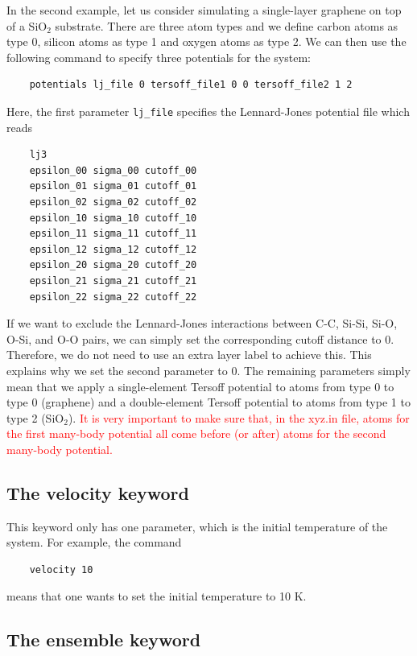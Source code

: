 \documentclass[12pt,a4paper]{report}
\begin{document}
In the second example, let us consider simulating a single-layer graphene on top of a SiO$_2$ substrate. There are three atom types and we define carbon atoms as type 0, silicon atoms as type 1 and oxygen atoms as type 2. We can then use the following command to specify three potentials for the system:
\begin{verbatim}
    potentials lj_file 0 tersoff_file1 0 0 tersoff_file2 1 2
\end{verbatim}
Here,  the first parameter \verb"lj_file" specifies the Lennard-Jones potential file which reads 
\begin{verbatim}
    lj3
    epsilon_00 sigma_00 cutoff_00
    epsilon_01 sigma_01 cutoff_01
    epsilon_02 sigma_02 cutoff_02
    epsilon_10 sigma_10 cutoff_10
    epsilon_11 sigma_11 cutoff_11
    epsilon_12 sigma_12 cutoff_12
    epsilon_20 sigma_20 cutoff_20
    epsilon_21 sigma_21 cutoff_21
    epsilon_22 sigma_22 cutoff_22
\end{verbatim}
If we want to exclude the Lennard-Jones interactions between C-C, Si-Si, Si-O, O-Si, and O-O pairs, we can simply set the corresponding cutoff distance to 0. Therefore, we do not need to use an extra layer label to achieve this. This explains why we set the second parameter to 0. The remaining parameters simply mean that we apply a single-element Tersoff potential to atoms from type 0 to type 0 (graphene) and a double-element Tersoff potential to atoms from type 1 to type 2 (SiO$_2$). \textcolor{red}{It is very important to make sure that, in the xyz.in file, atoms for the first many-body potential all come before (or after) atoms for the second many-body potential.}


\subsection{The velocity keyword}

This keyword only has one parameter, which is the initial temperature of the system. For example, the command
\begin{verbatim}
    velocity 10
\end{verbatim}
means that one wants to set the initial temperature to 10 K.

\subsection{The ensemble keyword}
\end{document}
